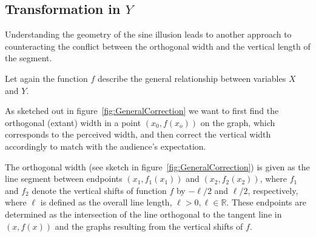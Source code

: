 \documentclass[12pt]{article}\usepackage[]{graphicx}\usepackage[]{color}
\newcommand{\xR}{\mathbb{R}}
\begin{document}
% 


\subsection{Transformation in $Y$}
Understanding the geometry of the sine illusion leads to another approach to counteracting  the conflict between the orthogonal width and the vertical length of the segment. 


Let again the function $f$ describe the general relationship between variables $X$ and $Y$. 


As sketched out in figure~\ref{fig:GeneralCorrection} we want to first find the orthogonal (extant) width in a point $(x_0, f(x_o))$ on the graph, which corresponds to the  perceived width, and then correct the vertical width accordingly to match with the audience's expectation.

The orthogonal width (see sketch in figure~\ref{fig:GeneralCorrection}) is given as the line segment between endpoints $(x_1, f_1(x_1))$ and $(x_2, f_2(x_2))$, where $f_1$ and $f_2$ denote the vertical shifts of function $f$ by $-\ell/2$ and $\ell/2$, respectively, where $\ell$ is defined as the overall line length, $\ell > 0, \ell \in \xR$.
These endpoints are determined as the intersection of the line  orthogonal to the tangent line in $(x, f(x))$ and the graphs resulting from the vertical shifts of $f$.
\end{document}
